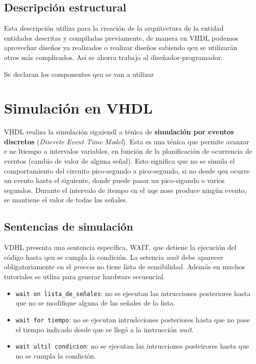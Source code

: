 \subsection{Descripción estructural}

Esta descripción utiliza para la creación de la arquitectura de la entidad entidades descritas y compiladas previamente, de manera en VHDL podemos aprovechar diseños ya realizados  o realizar diseños sabiendo qeu se utilizarán otros más complicados. Así se ahorra trabajo al diseñador-programador. 

Se declaran los componentes qeu se van a utilizar 

\section{Simulación en VHDL}

VHDL realiza la simulación siguiendl a ténica de \textbf{simulación por eventos discretos} (\textit{Discrete Event Time Model}). Esta es una ténica que permite avanzar e ne ltiempo a intervalos variables, en función de la planificación de ocurrencia de eventos (cambio de valor de alguna señal). Esto significa que no se simula el comportamiento del circuito pico-segundo a pico-segundo, si no desde qeu ocurre un evento hasta el siguiente, donde puede pasar un pico-sigundo o varios segundos. Durante el intervalo de itempo en el uqe nose produce ningún evento, se mantiene el valor de todas las señales. 

\subsection{Sentencias de simulación}

VDHL presenta una sentencia específica, WAIT, que detiene la ejecución del código hasta qeu se cumpla la condición. La setencia \textit{wait} debe aparecer obligatoriamente en el \textit{process} no tiene lista de sensibilidad. Además en muchos tutoriales se utliza para generar hardware secuencial. 

\begin{itemize}
    \item \texttt{wait on lista\_de\_señales}: no se ejecutan las intrucciones posteriores hasta que no se modifique alguna de las señales de la lista. 
    \item \texttt{wait for tiempo}: no se ejecutan intrudcciones posteriores hasta que no pase el tiempo indicado desde que se llegó a la instrucción \textit{wait}.
    \item \texttt{wait ultil condicion}: no se ejecutan las intrucciones posteirores hasta que no se cumpla la condición. 
\end{itemize}

